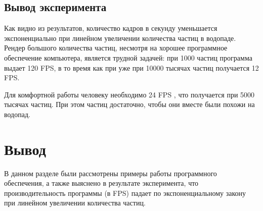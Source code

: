 
\clearpage

\subsection*{Вывод эксперимента}

Как видно из результатов, количество кадров в секунду уменьшается экспоненциально при линейном увеличении количества частиц в водопаде. Рендер большого количества частиц, несмотря на хорошее программное обеспечение компьютера, является трудной задачей: при 1000 частиц программа выдает 120 FPS, в то время как при уже при 10000 тысячах частиц получается 12 FPS. 

Для комфортной работы человеку необходимо 24 FPS \cite{fps}, что получается при 5000 тысячах частиц. При этом частиц достаточно, чтобы они вместе были похожи на водопад.


\section*{Вывод}

В данном разделе были рассмотрены примеры работы программного обеспечения, а также выяснено в результате эксперимента, что производительность программы (в FPS) падает по экспоненциальному закону при линейном увеличении количества частиц.

